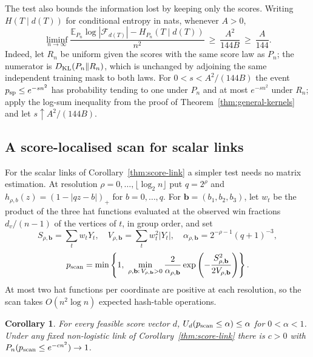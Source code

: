 \documentclass[11pt,a4paper]{article}
\newtheorem{corollary}[theorem]{Corollary}
\theoremstyle{definition}
\newcommand{\E}{\mathbb E}
\begin{document}
The test also bounds the information lost by keeping only the scores. Writing $H(T\mid d(T))$ for conditional entropy in nats, whenever $A>0$,
\begin{equation}\label{eq:entropy-deficit}
 \liminf_{n\to\infty}
 \frac{\E_{P_n}\log |\mathcal F_{d(T)}|-H_{P_n}(T\mid d(T))}{n^2}
 \ \ge\ \frac{A^2}{144B}\ \ge\ \frac{A}{144}.
\end{equation}
Indeed, let $R_n$ be uniform given the scores with the same score law as $P_n$; the numerator is $D_{\rm KL}(P_n\Vert R_n)$, which is unchanged by adjoining the same independent training mask to both laws. For $0<s<A^2/(144B)$ the event $p_{\rm sp}\le e^{-sn^2}$ has probability tending to one under $P_n$ and at most $e^{-sn^2}$ under $R_n$; apply the log-sum inequality from the proof of Theorem~\ref{thm:general-kernels} and let $s\uparrow A^2/(144B)$.

\subsection{A score-localised scan for scalar links}\label{sec:adaptive}

For the scalar links of Corollary~\ref{thm:score-link} a simpler test needs no matrix estimation. At resolution $\rho=0,\ldots,\lfloor\log_2 n\rfloor$ put $q=2^\rho$ and $h_{\rho,b}(z)=(1-|qz-b|)_+$ for $b=0,\ldots,q$. For $\mathbf b=(b_1,b_2,b_3)$, let $w_t$ be the product of the three hat functions evaluated at the observed win fractions $d_v/(n-1)$ of the vertices of $t$, in group order, and set
\[
 S_{\rho,\mathbf b}=\sum_t w_t Y_t,\quad
 V_{\rho,\mathbf b}=\sum_t w_t^2 |Y_t|,\quad
 \alpha_{\rho,\mathbf b}=2^{-\rho-1}(q+1)^{-3},
\]
\begin{equation}
 p_{\rm scan}=\min\left\{1,\
 \min_{\rho,\mathbf b:\,V_{\rho,\mathbf b}>0}\frac{2}{\alpha_{\rho,\mathbf b}}
       \exp\left(-\frac{S_{\rho,\mathbf b}^2}{2V_{\rm \rho,\mathbf b}}\right)\right\}.
 \label{eq:scan}
\end{equation}
At most two hat functions per coordinate are positive at each resolution, so the scan takes $O(n^2\log n)$ expected hash-table operations.

\begin{corollary}\label{cor:scan}
For every feasible score vector $d$, $U_d(p_{\rm scan}\le\alpha)\le\alpha$ for $0<\alpha<1$. Under any fixed non-logistic link of Corollary~\ref{thm:score-link} there is $c>0$ with $P_n(p_{\rm scan}\le e^{-cn^2})\to1$.
\end{corollary}
\end{document}
